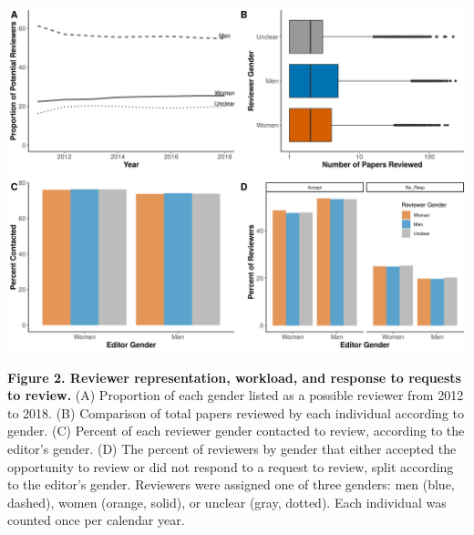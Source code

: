 \documentclass[11pt,]{article}
\begin{document}
\includegraphics{Figure_2.png}

\textbf{Figure 2. Reviewer representation, workload, and response to
requests to review.} (A) Proportion of each gender listed as a possible
reviewer from 2012 to 2018. (B) Comparison of total papers reviewed by
each individual according to gender. (C) Percent of each reviewer gender
contacted to review, according to the editor's gender. (D) The percent
of reviewers by gender that either accepted the opportunity to review or
did not respond to a request to review, split according to the editor's
gender. Reviewers were assigned one of three genders: men (blue,
dashed), women (orange, solid), or unclear (gray, dotted). Each
individual was counted once per calendar year.
\end{document}
